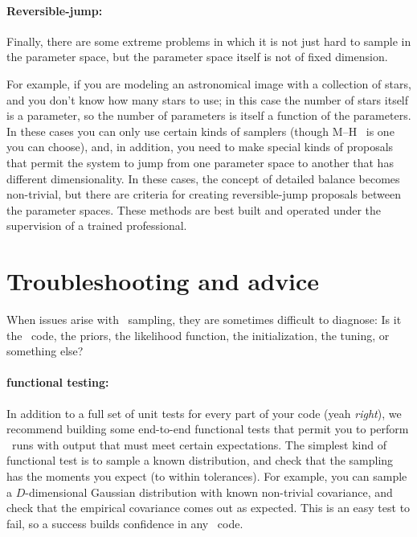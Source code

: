 \documentclass[12pt,twoside,pdftex]{article}
\newcommand{\MCMC}{\acronym{MCMC}}
\begin{document}
\paragraph{Reversible-jump:}
Finally, there are some extreme problems in which it is not just hard
to sample in the parameter space, but the parameter space itself is
not of fixed dimension.

For example, if you are modeling an astronomical image with a
collection of stars, and you don't know how many stars to use; in this
case the number of stars itself is a parameter, so the number of
parameters is itself a function of the parameters.
In these cases you can only use certain kinds of samplers (though M--H
\MCMC\ is one you can choose), and, in addition, you need to make
special kinds of proposals that permit the system to jump from one
parameter space to another that has different dimensionality.
In these cases, the concept of detailed balance becomes non-trivial,
but there are criteria for creating reversible-jump proposals between
the parameter spaces.
These methods are best built and operated under the supervision of a
trained professional.

\section{Troubleshooting and advice}\label{sec:trouble}

When issues arise with \MCMC\ sampling,
  they are sometimes difficult to diagnose:
Is it the \MCMC\ code, the priors, the likelihood function,
  the initialization, the tuning, or something else?

\paragraph{functional testing:}
In addition to a full set of unit tests for every part of your code
  (yeah \emph{right}),
  we recommend building some end-to-end functional tests that permit you to perform \MCMC\
  runs with output that must meet certain expectations.
The simplest kind of functional test is to sample a known distribution,
  and check that the sampling has the moments you expect (to within tolerances).
For example, you can sample a $D$-dimensional Gaussian distribution with known non-trivial covariance,
  and check that the empirical covariance comes out as expected.
This is an easy test to fail, so a success builds confidence in any \MCMC\ code.
\end{document}
